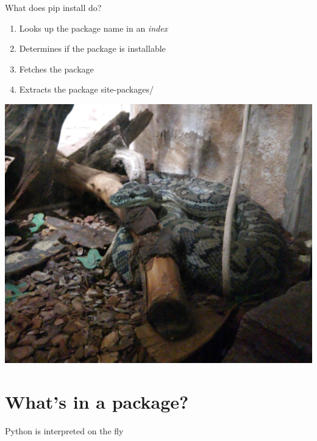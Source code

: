 \documentclass[pdf]{beamer}
\begin{document}
\begin{frame}
    \begin{block}{}
        What does pip install do?
    \end{block}
\end{frame}

\begin{frame}
    \begin{enumerate}
        \item Looks up the package name in an \emph{index}
        \item Determines if the package is installable
        \item Fetches the package
        \item Extracts the package site-packages/
    \end{enumerate}
\end{frame}

\begin{frame}
    \begin{center}
    \includegraphics[keepaspectratio, height = 0.9\textheight]{img/snake.jpg}
    \end{center}
\end{frame}

\section{What's in a package?}
\begin{frame}
    Python is interpreted on the fly

\end{frame}
\end{document}
